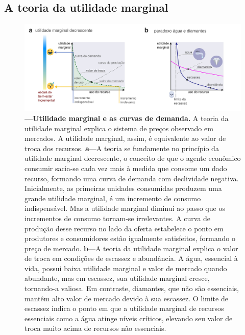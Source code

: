 \documentclass[./main.tex]{subfiles}
\begin{document}
\subsection{A teoria da utilidade marginal} \label{subsec:marginutil}

\begin{figure}[t!] 
\centering				
\includegraphics[width=0.98\linewidth]{figs/fig_marginalutil.jpg}		
\caption[Utilidade marginal e as curvas de demanda]
{\textbf{---\;Utilidade marginal e as curvas de demanda.}
    A teoria da utilidade marginal explica o sistema de preços observado em mercados. A utilidade marginal, assim, é equivalente ao valor de troca dos recursos. 
    \;\textbf{a}\;---\;A teoria se fundamente no princípio da utilidade marginal decrescente, o conceito de que o agente econômico consumir sacia-se cada vez mais à medida que consome um dado recurso, formando uma curva de demanda com declividade negativa. Inicialmente, as primeiras unidades consumidas produzem uma grande utilidade marginal, é um incremento de consumo indispensável. Mas a utilidade marginal diminui ao passo que os incrementos de consumo tornam-se irrelevantes. A curva de produção desse recurso no lado da oferta estabelece o ponto em produtores e consumidores estão igualmente satisfeitos, formando o preço de mercado.
    \;\textbf{b}\;---\;A teoria da utilidade marginal explica o valor de troca em condições de escassez e abundância. A água, essencial à vida, possui baixa utilidade marginal e valor de mercado quando abundante, mas em escassez, sua utilidade marginal cresce, tornando-a valiosa. Em contraste, diamantes, que não são essenciais, mantêm alto valor de mercado devido à sua escassez. O limite de escassez indica o ponto em que a utilidade marginal de recursos essenciais como a água atinge níveis críticos, elevando seu valor de troca muito acima de recursos não essenciais.
}
\label{fig:eco:marginutil} 		
\end{figure}
\end{document}
